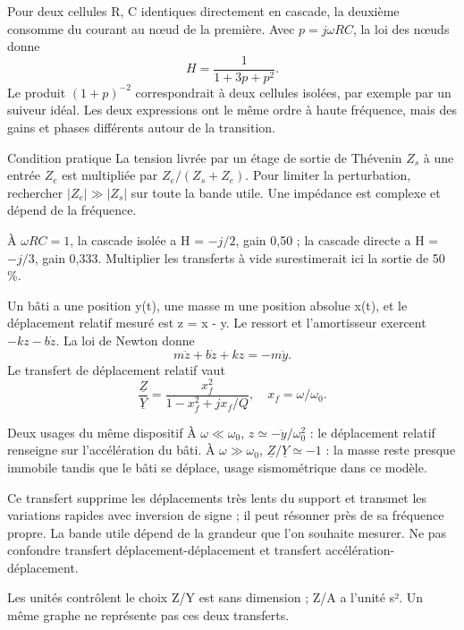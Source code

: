 Pour deux cellules R, C identiques directement en cascade, la deuxième consomme du courant au nœud de la première. Avec $p=j\omega RC$, la loi des nœuds donne\[H=\frac1{1+3p+p^2}.\]Le produit $(1+p)^{-2}$ correspondrait à deux cellules isolées, par exemple par un suiveur idéal. Les deux expressions ont le même ordre à haute fréquence, mais des gains et phases différents autour de la transition.
\begin{methode}{Condition pratique}
La tension livrée par un étage de sortie de Thévenin $Z_s$ à une entrée $Z_e$ est multipliée par $Z_e/(Z_s+Z_e)$. Pour limiter la perturbation, rechercher $|Z_e|\gg|Z_s|$ sur toute la bande utile. Une impédance est complexe et dépend de la fréquence.
\end{methode}
À $\omega RC=1$, la cascade isolée a H = $-j/2$, gain 0,50 ; la cascade directe a H = $-j/3$, gain 0,333. Multiplier les transferts à vide surestimerait ici la sortie de 50 \%.


Un bâti a une position y(t), une masse m une position absolue x(t), et le déplacement relatif mesuré est z = x - y. Le ressort et l’amortisseur exercent $-kz-b\dot z$. La loi de Newton donne\[m\ddot z+b\dot z+kz=-m\ddot y.\]Le transfert de déplacement relatif vaut\[\frac{\underline Z}{\underline Y}=\frac{x_f^2}{1-x_f^2+jx_f/Q},\quad x_f=\omega/\omega_0.\]
\begin{loi}{Deux usages du même dispositif}
À $\omega\ll\omega_0$, $z\simeq-\ddot y/\omega_0^2$ : le déplacement relatif renseigne sur l’accélération du bâti. À $\omega\gg\omega_0$, $\underline Z/\underline Y\simeq-1$ : la masse reste presque immobile tandis que le bâti se déplace, usage sismométrique dans ce modèle.
\end{loi}
Ce transfert supprime les déplacements très lents du support et transmet les variations rapides avec inversion de signe ; il peut résonner près de sa fréquence propre. La bande utile dépend de la grandeur que l’on souhaite mesurer. Ne pas confondre transfert déplacement-déplacement et transfert accélération-déplacement.
\begin{piege}{Les unités contrôlent le choix}
Z/Y est sans dimension ; Z/A a l’unité s². Un même graphe ne représente pas ces deux transferts.
\end{piege}


